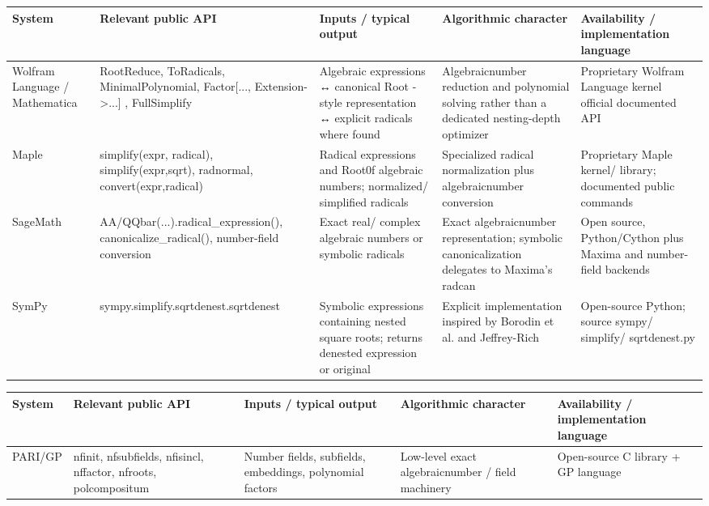 \documentclass[10pt]{article}
\begin{document}
\begin{center}
\begin{tabular}[t]{|l|l|l|l|l|}
\hline
System & Relevant public API & Inputs / typical output & Algorithmic character & Availability / implementation language \\
\hline
Wolfram Language / Mathematica & RootReduce, ToRadicals, MinimalPolynomial, Factor[..., Extension->...] , FullSimplify & Algebraic expressions ↔ canonical Root -style representation ↔ explicit radicals where found & Algebraicnumber reduction and polynomial solving rather than a dedicated nesting-depth optimizer & Proprietary Wolfram Language kernel official documented API \\
\hline
Maple & simplify(expr, radical), simplify(expr,sqrt), radnormal, convert(expr,radical) & Radical expressions and Root0f algebraic numbers; normalized/ simplified radicals & Specialized radical normalization plus algebraicnumber conversion & Proprietary Maple kernel/ library; documented public commands \\
\hline
SageMath & AA/QQbar(...).radical\_expression(), canonicalize\_radical(), number-field conversion & Exact real/ complex algebraic numbers or symbolic radicals & Exact algebraicnumber representation; symbolic canonicalization delegates to Maxima's radcan & Open source, Python/Cython plus Maxima and number-field backends \\
\hline
SymPy & sympy.simplify.sqrtdenest.sqrtdenest & Symbolic expressions containing nested square roots; returns denested expression or original & Explicit implementation inspired by Borodin et al. and Jeffrey-Rich & Open-source Python; source sympy/ simplify/ sqrtdenest.py \\
\hline
\end{tabular}
\end{center}

\begin{center}
\begin{tabular}[t]{|l|l|l|l|l|}
\hline
System & Relevant public API & Inputs / typical output & Algorithmic character & Availability / implementation language \\
\hline
PARI/GP & nfinit, nfsubfields, nfisincl, nffactor, nfroots, polcompositum & Number fields, subfields, embeddings, polynomial factors & Low-level exact algebraicnumber / field machinery & Open-source C library + GP language \\
\hline
\end{tabular}
\end{center}
\end{document}
